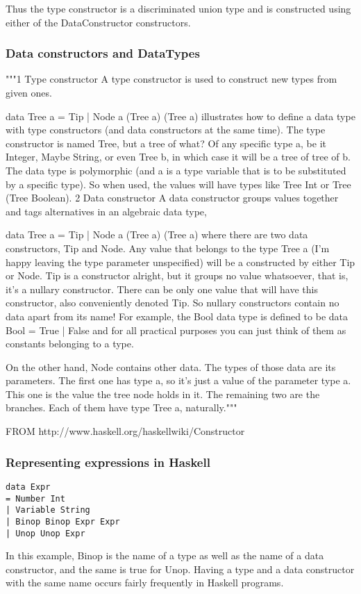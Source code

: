 Thus the type constructor is a discriminated union type and is constructed using either of the DataConstructor constructors.


\subsubsection{Data constructors and DataTypes}
"""1 Type constructor
A type constructor is used to construct new types from given ones.

data Tree a = Tip | Node a (Tree a) (Tree a)
illustrates how to define a data type with type constructors (and data constructors at the same time). The type constructor is named Tree, but a tree of what? Of any specific type a, be it Integer, Maybe String, or even Tree b, in which case it will be a tree of tree of b. The data type is polymorphic (and a is a type variable that is to be substituted by a specific type). So when used, the values will have types like Tree Int or Tree (Tree Boolean).
2 Data constructor
A data constructor groups values together and tags alternatives in an algebraic data type,

data Tree a = Tip | Node a (Tree a) (Tree a)
where there are two data constructors, Tip and Node. Any value that belongs to the type Tree a (I'm happy leaving the type parameter unspecified) will be a constructed by either Tip or Node. Tip is a constructor alright, but it groups no value whatsoever, that is, it's a nullary constructor. There can be only one value that will have this constructor, also conveniently denoted Tip. So nullary constructors contain no data apart from its name! For example, the Bool data type is defined to be
data Bool = True | False
and for all practical purposes you can just think of them as constants belonging to a type.

On the other hand, Node contains other data. The types of those data are its parameters. The first one has type a, so it's just a value of the parameter type a. This one is the value the tree node holds in it. The remaining two are the branches. Each of them have type Tree a, naturally."""

FROM http://www.haskell.org/haskellwiki/Constructor 

\subsubsection{Representing expressions in Haskell}
\begin{lstlisting}
data Expr
= Number Int
| Variable String
| Binop Binop Expr Expr
| Unop Unop Expr
\end{lstlisting}
In this example, Binop is the name of a type
as well as the name of a data constructor, and the
same is true for Unop.
Having a type and a data constructor with the same
name occurs fairly frequently in Haskell programs.

